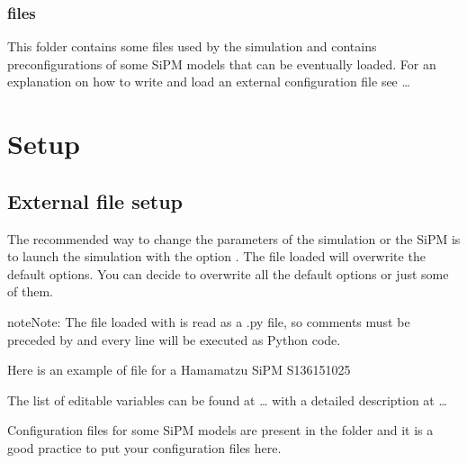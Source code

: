 \documentclass[letterpaper,10pt,english]{sphinxmanual}
\begin{document}
\subsection{files}
\label{\detokenize{structure:files}}
This folder contains some files used by the simulation and contains pre\sphinxhyphen{}configurations of some SiPM models that can be eventually loaded.
For an explanation on how to write and load an external configuration file see …


\chapter{Setup}
\label{\detokenize{setup:setup}}\label{\detokenize{setup::doc}}

\section{External file setup}
\label{\detokenize{setup:external-file-setup}}
The recommended way to change the parameters of the simulation or the SiPM is to launch the simulation with the option . The file loaded will overwrite the default options.
You can decide to overwrite all the default options or just some of them.

\begin{sphinxadmonition}{note}{Note:}
The file loaded with  is read as a .py file, so comments must be preceded by \sphinxtitleref{\#} and every line will be executed as Python code.
\end{sphinxadmonition}

Here is an example of file for a Hamamatzu SiPM S13615\sphinxhyphen{}1025

\begin{sphinxVerbatim}[commandchars=\\\{\}]
  
  
  
  
  
  
  

  
  
  
\end{sphinxVerbatim}

\begin{DUlineblock}{0em}
\item[] The list of editable variables can be found at … with a detailed description at …
\item[] Configuration files for some SiPM models are present in the  folder and it is a good practice to put your configuration files here.
\end{DUlineblock}
\end{document}

